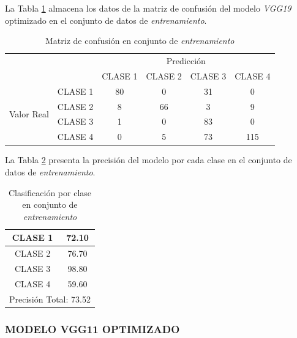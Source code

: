 La Tabla \ref{tab:MC_VGG19_OPT_2} almacena los datos de la matriz de confusión del modelo \textit{VGG19} optimizado en el conjunto de datos de \textit{entrenamiento}.

\begin{table}[htbp]
	\centering	
	\resizebox{10cm}{!} {
	\begin{tabular}{|c|l|c|c|c|c|}
		\hline
		\multicolumn{2}{|c|}{\multirow{2}[4]{*}{}} & \multicolumn{4}{c|}{Predicción} \bigstrut\\
		\cline{3-6}    \multicolumn{2}{|c|}{} & CLASE 1 & CLASE 2 & CLASE 3 & CLASE 4 \bigstrut\\
		\hline
		\multirow{4}[8]{*}{\begin{sideways}Valor Real\end{sideways}} & CLASE 1 & 80    & 0     & 31    & 0 \bigstrut\\
		\cline{2-6}          & CLASE 2 & 8     & 66     & 3    & 9 \bigstrut\\
		\cline{2-6}          & CLASE 3 & 1     & 0     & 83    & 0 \bigstrut\\
		\cline{2-6}          & CLASE 4 & 0     & 5     & 73    & 115 \bigstrut\\
		\hline
	\end{tabular}
	}
	\caption{Matriz de confusión en conjunto de \textit{entrenamiento}}
	\label{tab:MC_VGG19_OPT_2}%
\end{table}%

La Tabla \ref{tab:VGG19optclases_2} presenta la precisión del modelo por cada clase en el conjunto de datos de \textit{entrenamiento}.

\begin{table}[htbp]
	\centering
	\begin{tabular}{|c|c|}
		\hline
		CLASE 1 & 72.10 \bigstrut\\
		\hline
		CLASE 2 & 76.70 \bigstrut\\
		\hline
		CLASE 3 & 98.80 \bigstrut\\
		\hline
		CLASE 4 & 59.60 \bigstrut\\
		\hline
		\multicolumn{2}{|c|}{Precisión Total: 73.52} \bigstrut\\
		\hline
	\end{tabular}%
	\caption{Clasificación por clase en conjunto de \textit{entrenamiento}}
	\label{tab:VGG19optclases_2}%
\end{table}

\subsubsection{\MakeUppercase{Modelo VGG11 optimizado}}

